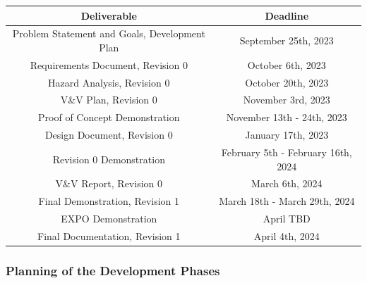\documentclass[12pt]{article}
\begin{document}
    \begin{center}
    \begin{tabular}{ |c|c| } 
    \hline
    \textbf{Deliverable} & \textbf{Deadline} \\ 
    \hline
    Problem Statement and Goals, Development Plan & September 25th, 2023 \\ 
    Requirements Document, Revision 0  & October 6th, 2023 \\
    Hazard Analysis, Revision 0 & October 20th, 2023  \\ 
    V\&V Plan, Revision 0 & November 3rd, 2023 \\ 
    Proof of Concept Demonstration & November 13th - 24th, 2023 \\
    Design Document, Revision 0 & January 17th, 2023 \\
    Revision 0 Demonstration & February 5th - February 16th, 2024\\
    V\&V Report, Revision 0 & March 6th, 2024 \\
    Final Demonstration, Revision 1 & March 18th - March 29th, 2024 \\
    EXPO Demonstration & April TBD \\
    Final Documentation, Revision 1 & April 4th, 2024 \\
    \hline
    \end{tabular}
    \end{center}

\subsubsection{Planning of the Development Phases}
\end{document}
